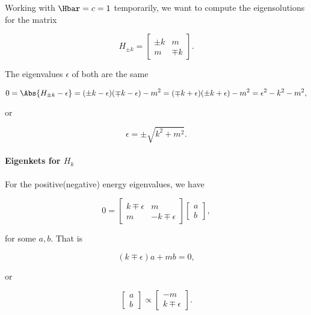 Working with \( \Hbar = c = 1 \) temporarily, we want to compute the eigensolutions for the matrix

\begin{dmath}\label{eqn:gradQuantumProblemSet4Problem3:80}
H_{\pm k}
=
\begin{bmatrix}
\pm k & m \\
m & \mp k
\end{bmatrix}.
\end{dmath}

The eigenvalues \( \epsilon \) of both are the same

\begin{dmath}\label{eqn:gradQuantumProblemSet4Problem3:100}
0
=
\Abs{ H_{\pm k} - \epsilon }
=
(\pm k - \epsilon)(\mp k - \epsilon) - m^2
=
(\mp k + \epsilon)(\pm k + \epsilon) - m^2
=
\epsilon^2 - k^2 - m^2,
\end{dmath}

or

\begin{dmath}\label{eqn:gradQuantumProblemSet4Problem3:120}
\epsilon = \pm \sqrt{k^2 + m^2}.
\end{dmath}

\paragraph{Eigenkets for \( H_k \)}

For the positive(negative) energy eigenvalues, we have

\begin{dmath}\label{eqn:gradQuantumProblemSet4Problem3:140}
0
=
\begin{bmatrix}
k \mp \epsilon & m \\
m & -k \mp \epsilon
\end{bmatrix}
\begin{bmatrix}
a \\
b
\end{bmatrix},
\end{dmath}

for some \( a, b\).  That is

\begin{dmath}\label{eqn:gradQuantumProblemSet4Problem3:160}
(k \mp \epsilon) a + m b = 0,
\end{dmath}

or

\begin{dmath}\label{eqn:gradQuantumProblemSet4Problem3:180}
\begin{bmatrix}
a \\
b
\end{bmatrix}
\propto
\begin{bmatrix}
- m \\
k \mp \epsilon
\end{bmatrix}.
\end{dmath}

